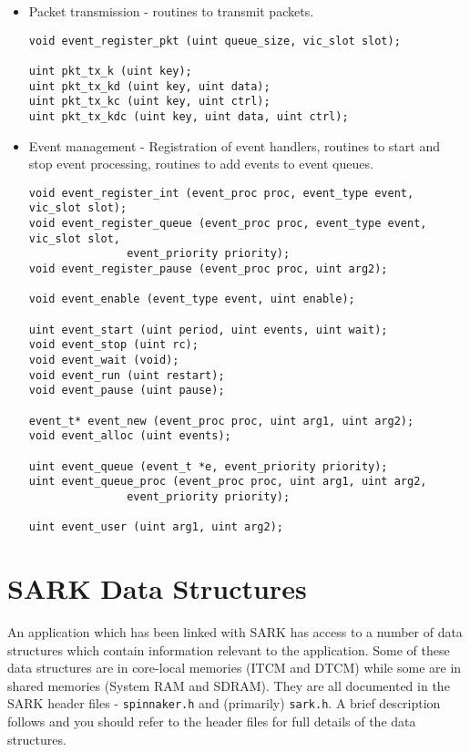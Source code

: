 \begin{itemize}
\item
Packet transmission - routines to transmit packets.

\lstset{language=C}
\begin{lstlisting}
void event_register_pkt (uint queue_size, vic_slot slot);

uint pkt_tx_k (uint key);
uint pkt_tx_kd (uint key, uint data);
uint pkt_tx_kc (uint key, uint ctrl);
uint pkt_tx_kdc (uint key, uint data, uint ctrl);
\end{lstlisting}

\item
Event management - Registration of event handlers, routines to start
and stop event processing, routines to add events to event queues.

\lstset{language=C}
\begin{lstlisting}
void event_register_int (event_proc proc, event_type event, vic_slot slot);
void event_register_queue (event_proc proc, event_type event, vic_slot slot,
			   event_priority priority);
void event_register_pause (event_proc proc, uint arg2);

void event_enable (event_type event, uint enable);

uint event_start (uint period, uint events, uint wait);
void event_stop (uint rc);
void event_wait (void);
void event_run (uint restart);
void event_pause (uint pause);

event_t* event_new (event_proc proc, uint arg1, uint arg2);
void event_alloc (uint events);

uint event_queue (event_t *e, event_priority priority);
uint event_queue_proc (event_proc proc, uint arg1, uint arg2,
		       event_priority priority);

uint event_user (uint arg1, uint arg2);
\end{lstlisting}

\end{itemize}

\section{SARK Data Structures}

An application which has been linked with SARK has access to a number
of data structures which contain information relevant to the
application. Some of these data structures are in core-local memories
(ITCM and DTCM) while some are in shared memories (System RAM and
SDRAM). They are all documented in the SARK header files
- \texttt{spinnaker.h} and (primarily) \texttt{sark.h}. A brief
description follows and you should refer to the header files for full
details of the data structures.

